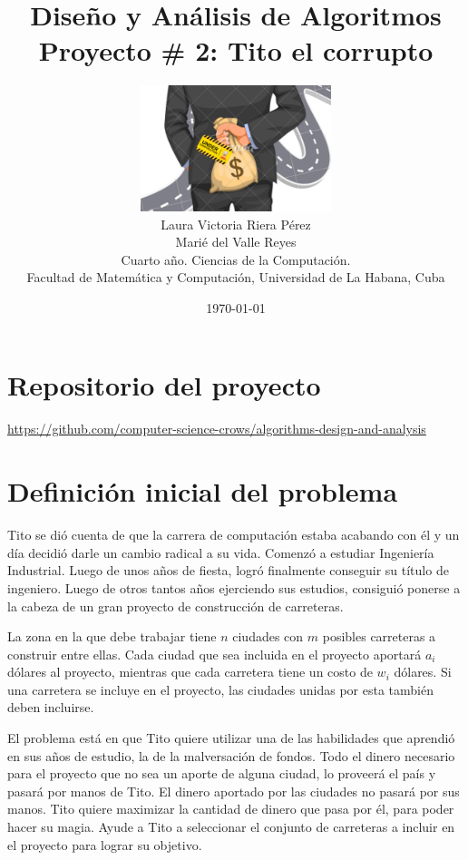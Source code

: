 \documentclass[10pt]{article} %
\title{\normalsize{Dise\~no y An\'alisis de Algoritmos }\\
	\Huge\bfseries Proyecto \# 2: Tito el corrupto \\
} %
\author{%
	\includegraphics[width=15em]{logo.png} \vspace{1em}\\
	Laura Victoria Riera P\'erez\\
	Mari\'e del Valle Reyes \vspace{1em} \\
	\small Cuarto a\~no. Ciencias de la Computaci\'on. \\ %
	\small Facultad de Matem\'atica y Computaci\'on, Universidad de La Habana, Cuba \\ %
}
\date{\footnotesize \today } %
\begin{document}
	\maketitle
	
	
	\section{Repositorio del proyecto}
	
	\begin{center}
		\href{https://github.com/computer-science-crows/algorithms-design-and-analysis}{https://github.com/computer-science-crows/algorithms-design-and-analysis}
	\end{center}

	\section{Definici\'on inicial del problema} 

	Tito se dió cuenta de que la carrera de computación estaba acabando con él y un día decidió darle un cambio radical a su vida. Comenzó a estudiar Ingeniería Industrial. Luego de unos años de fiesta, logró finalmente conseguir su título de ingeniero. Luego de otros tantos años ejerciendo sus estudios, consiguió ponerse a la cabeza de un gran proyecto de construcción de carreteras.
	
	La zona en la que debe trabajar tiene $n$ ciudades con $m$ posibles carreteras a construir entre ellas. Cada ciudad que sea incluida en el proyecto aportará $a_i$ dólares al proyecto, mientras que cada carretera tiene un costo de $w_i$ dólares. Si una carretera se incluye en el proyecto, las ciudades unidas por esta también deben incluirse.
	
	El problema está en que Tito quiere utilizar una de las habilidades que aprendió en sus años de estudio, la de la malversación de fondos. Todo el dinero necesario para el proyecto que no sea un aporte de alguna ciudad, lo proveerá el país y pasará por manos de Tito. El dinero aportado por las ciudades no pasará por sus manos. Tito quiere maximizar la cantidad de dinero que pasa por él, para poder hacer su magia. Ayude a Tito a seleccionar el conjunto de carreteras a incluir en el proyecto para lograr su objetivo.
	
\end{document}
